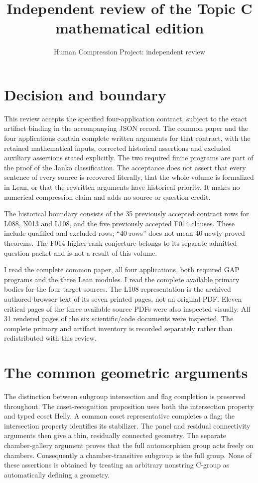 \documentclass[11pt]{article}
\title{Independent review of the Topic C mathematical edition}
\author{Human Compression Project: independent review}
\date{}
\begin{document}
\maketitle

\section{Decision and boundary}

This review accepts the specified four-application contract, subject to the exact
artifact binding in the accompanying JSON record. The common paper and the four
applications contain complete written arguments for that contract, with the
retained mathematical inputs, corrected historical assertions and excluded
auxiliary assertions stated explicitly. The two required finite programs are
part of the proof of the Janko classification. The acceptance does not assert
that every sentence of every source is recovered literally, that the whole
volume is formalized in Lean, or that the rewritten arguments have historical
priority. It makes no numerical compression claim and adds no source or question
credit.

The historical boundary consists of the 35 previously accepted contract rows
for L088, N013 and L108, and the five previously accepted F014 clauses. These
include qualified and excluded rows; ``40 rows'' does not mean 40 newly proved
theorems. The F014 higher-rank conjecture belongs to its separate admitted
question packet and is not a result of this volume.

I read the complete common paper, all four applications, both required GAP
programs and the three Lean modules. I read the complete available primary
bodies for the four target sources. The L108 representation is the archived
authored browser text of its seven printed pages, not an original PDF. Eleven
critical pages of the three available source PDFs were also inspected visually.
All 31 rendered pages of the six scientific/code documents were inspected. The
complete primary and artifact inventory is recorded separately rather than
redistributed with this review.

\section{The common geometric arguments}

The distinction between subgroup intersection and flag completion is preserved
throughout. The coset-recognition proposition uses both the intersection
property and typed coset Helly. A common coset representative completes a flag;
the intersection property identifies its stabilizer. The panel and residual
connectivity arguments then give a thin, residually connected geometry. The
separate chamber-gallery argument proves that the full automorphism group acts
freely on chambers. Consequently a chamber-transitive subgroup is the full
group. None of these assertions is obtained by treating an arbitrary nonstring
C-group as automatically defining a geometry.
\end{document}
